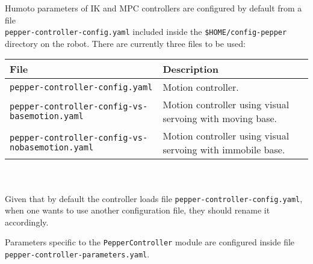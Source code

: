 \noindent Humoto parameters of IK and MPC controllers are configured by default from a file\\
\texttt{pepper-controller-config.yaml} included inside the \texttt{\$HOME/config-pepper} directory on the robot. There are currently three
files to be used:\\
\begin{tabular}{|l|p{5cm}|}
\hline
File & Description \\
\hline
\texttt{pepper-controller-config.yaml} & Motion controller.\\
\hline
\texttt{pepper-controller-config-vs-basemotion.yaml} & Motion controller using visual servoing with moving base.\\ \hline
\texttt{pepper-controller-config-vs-nobasemotion.yaml} & Motion controller using visual servoing with immobile base.\\ 
\hline
\end{tabular} \\ \\

\noindent Given that by default the controller loads file \texttt{pepper-controller-config.yaml}, when one wants to use 
another configuration file, they should rename it accordingly.

\noindent Parameters specific to the \texttt{PepperController} module are configured inside file\\
\texttt{pepper-controller-parameters.yaml}.\\

